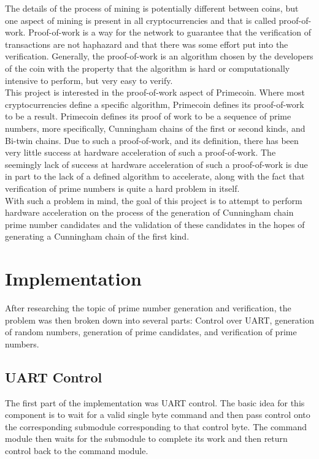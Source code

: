 \documentclass[journal]{IEEEtran}
\begin{document}
The details of the process of mining is potentially different between coins, but one aspect of mining is present in all cryptocurrencies and that is called proof-of-work. Proof-of-work is a way for the network to guarantee that the verification of transactions are not haphazard and that there was some effort put into the verification. Generally, the proof-of-work is an algorithm chosen by the developers of the coin with the property that the algorithm is hard or computationally intensive to perform, but very easy to verify.\\

This project is interested in the proof-of-work aspect of Primecoin. Where most cryptocurrencies define a specific algorithm, Primecoin defines its proof-of-work to be a result. Primecoin defines its proof of work to be a sequence of prime numbers, more specifically, Cunningham chains of the first or second kinds, and Bi-twin chains.\cite{primecoin} Due to such a proof-of-work, and its definition, there has been very little success at hardware acceleration of such a proof-of-work. The seemingly lack of success at hardware acceleration of such a proof-of-work is due in part to the lack of a defined algorithm to accelerate, along with the fact that verification of prime numbers is quite a hard problem in itself.\\

With such a problem in mind, the goal of this project is to attempt to perform hardware acceleration on the process of the generation of Cunningham chain prime number candidates and the validation of these candidates in the hopes of generating a Cunningham chain of the first kind.


 

\section{Implementation}
After researching the topic of prime number generation and verification, the problem was then broken down into several parts: Control over UART, generation of random numbers, generation of prime candidates, and verification of prime numbers.

\subsection{UART Control}
The first part of the implementation was UART control. The basic idea for this component is to wait for a valid single byte command and then pass control onto the corresponding submodule corresponding to that control byte. The command module then waits for the submodule to complete its work and then return control back to the command module.
\end{document}
